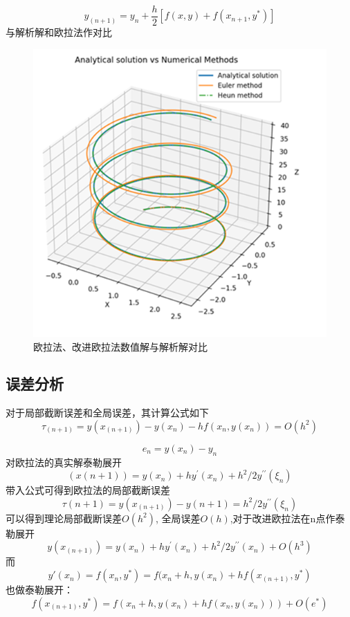 \documentclass[11pt]{article}
\begin{document}
\begin{equation*}
    y_{(n+1)}=y_n+\frac{h}{2}[f(x,y)+f(x_{n+1},y^*)]
\end{equation*}
与解析解和欧拉法作对比
\begin{figure}[h]
    \centering
    \includegraphics[width=0.5\linewidth]{Fig/Heun Method.png}
    \caption{欧拉法、改进欧拉法数值解与解析解对比}
    \label{fig:2}
\end{figure}

\subsection{误差分析}
对于局部截断误差和全局误差，其计算公式如下
\begin{equation*}
    \tau_{\left(n+1\right)}=y\left(x_{\left(n+1\right)}\right)-y\left(x_n\right)-hf\left(x_n,y\left(x_n\right)\right)=O\left(h^2\right)
\end{equation*}

\begin{equation*}
    e_n=y\left(x_n\right)-y_n
\end{equation*}
对欧拉法的真实解泰勒展开
\begin{equation*}
    \left(x\left(n+1\right)\right)=y\left(x_n\right)+hy^\prime\left(x_n\right)+h^2/2y^{\prime\prime}\left(\xi_n\right)
\end{equation*}
带入公式可得到欧拉法的局部截断误差
\begin{equation*}
    \tau\left(n+1\right)=y\left(x_{\left(n+1\right)}\right)-y\left(n+1\right)=h^2/2y^{\prime\prime}\left(\xi_n\right)
\end{equation*}
可以得到理论局部截断误差$O(h^2)$, 全局误差$O(h)$,对于改进欧拉法在n点作泰勒展开
\begin{equation*}
    y\left(x_{\left(n+1\right)}\right)=y\left(x_n\right)+hy^\prime\left(x_n\right)+h^2/2y^{\prime\prime}\left(x_n\right)+O\left(h^3\right)
\end{equation*}
而 $$y'(x_n)=f(x_n,y^*)=f(x_n+h,y(x_n)+hf(x_{(n+1)},y^*)$$也做泰勒展开：
\begin{equation*}
    f\left(x_{\left(n+1\right)},y^\ast\right)=f\left(x_n+h,y\left(x_n\right)+hf\left(x_n,y\left(x_n\right)\right)\right)+O\left(e^\ast\right)
\end{equation*}
\end{document}
